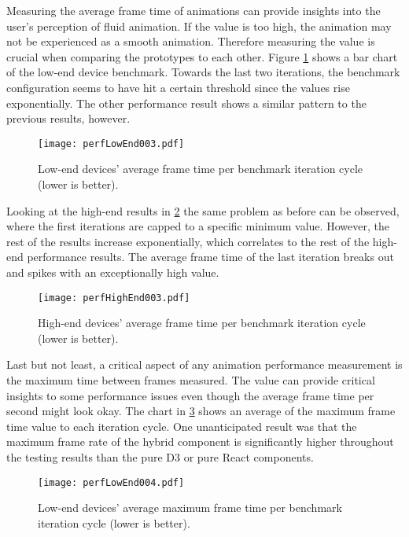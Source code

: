 
Measuring the average frame time of animations can provide insights into the user's perception of fluid animation. If the value is too high, the animation may not be experienced as a smooth animation. Therefore measuring the value is crucial when comparing the prototypes to each other. Figure \ref{fig:perfLowEnd003} shows a bar chart of the low-end device benchmark. Towards the last two iterations, the benchmark configuration seems to have hit a certain threshold since the values rise exponentially. The other performance result shows a similar pattern to the previous results, however.

\begin{figure}
\centering
\texttt{[image: perfLowEnd003.pdf]}
\caption{Low-end devices' average frame time per benchmark iteration cycle (lower is better).}
\label{fig:perfLowEnd003}
\end{figure}

Looking at the high-end results in \ref{fig:perfHighEnd003} the same problem as before can be observed, where the first iterations are capped to a specific minimum value. However, the rest of the results increase exponentially, which correlates to the rest of the high-end performance results. The average frame time of the last iteration breaks out and spikes with an exceptionally high value.

\begin{figure}
\centering
\texttt{[image: perfHighEnd003.pdf]}
\caption{High-end devices' average frame time per benchmark iteration cycle (lower is better).}
\label{fig:perfHighEnd003}
\end{figure}

Last but not least, a critical aspect of any animation performance measurement is the maximum time between frames measured. The value can provide critical insights to some performance issues even though the average frame time per second might look okay. The chart in \ref{fig:perfLowEnd004} shows an average of the maximum frame time value to each iteration cycle. One unanticipated result was that the maximum frame rate of the hybrid component is significantly higher throughout the testing results than the pure D3 or pure React components.

\begin{figure}
\centering
\texttt{[image: perfLowEnd004.pdf]}
\caption{Low-end devices' average maximum frame time per benchmark iteration cycle (lower is better).}
\label{fig:perfLowEnd004}
\end{figure}

